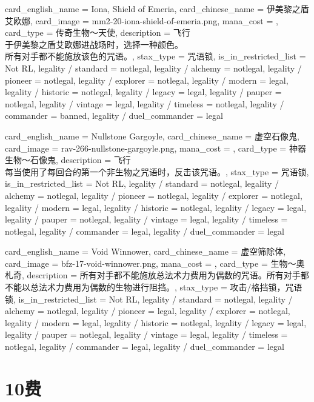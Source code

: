 \documentclass[lang = cn, color = black, 10pt]{AllThatStax}
\begin{document}
\card
{
	card_english_name = {Iona, Shield of Emeria},
	card_chinese_name = {伊美黎之盾艾欧娜},
	card_image = mm2-20-iona-shield-of-emeria.png,
	mana_cost = ,
	card_type = 传奇生物～天使,
	description = {飞行\\
		于伊美黎之盾艾欧娜进战场时，选择一种颜色。\\
		所有对手都不能施放该色的咒语。},
	stax_type = 咒语锁,
	is_in_restricted_list = Not RL,
	legality / standard = notlegal,
	legality / alchemy = notlegal,
	legality / pioneer = notlegal,
	legality / explorer = notlegal,
	legality / modern = legal,
	legality / historic = notlegal,
	legality / legacy = legal,
	legality / pauper = notlegal,
	legality / vintage = legal,
	legality / timeless = notlegal,
	legality / commander = banned,
	legality / duel_commander = legal
}

\card
{
	card_english_name = {Nullstone Gargoyle},
	card_chinese_name = {虚空石像鬼},
	card_image = rav-266-nullstone-gargoyle.png,
	mana_cost = ,
	card_type = 神器生物～石像鬼,
	description = {飞行\\
		每当使用了每回合的第一个非生物之咒语时，反击该咒语。},
	stax_type = 咒语锁,
	is_in_restricted_list = Not RL,
	legality / standard = notlegal,
	legality / alchemy = notlegal,
	legality / pioneer = notlegal,
	legality / explorer = notlegal,
	legality / modern = legal,
	legality / historic = notlegal,
	legality / legacy = legal,
	legality / pauper = notlegal,
	legality / vintage = legal,
	legality / timeless = notlegal,
	legality / commander = legal,
	legality / duel_commander = legal
}

\card
{
	card_english_name = {Void Winnower},
	card_chinese_name = {虚空筛除体},
	card_image = bfz-17-void-winnower.png,
	mana_cost = ,
	card_type = 生物～奥札奇,
	description = {所有对手都不能施放总法术力费用为偶数的咒语。所有对手都不能以总法术力费用为偶数的生物进行阻挡。},
	stax_type = 攻击/格挡锁，咒语锁,
	is_in_restricted_list = Not RL,
	legality / standard = notlegal,
	legality / alchemy = notlegal,
	legality / pioneer = legal,
	legality / explorer = notlegal,
	legality / modern = legal,
	legality / historic = notlegal,
	legality / legacy = legal,
	legality / pauper = notlegal,
	legality / vintage = legal,
	legality / timeless = notlegal,
	legality / commander = legal,
	legality / duel_commander = legal
}

\chapter{10费}
\end{document}
